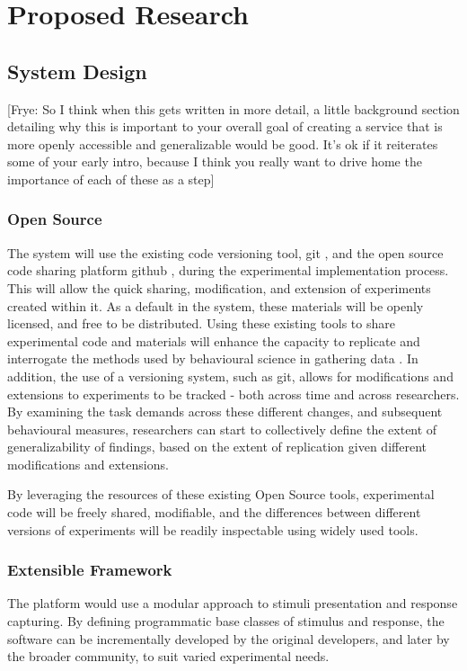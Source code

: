 \documentclass[12pt,a4paper,titlepage]{scrreprt}
\begin{document}
\chapter{Proposed Research}
\section{System Design}
[Frye: So I think when this gets written in more detail, a little background section detailing why this is important to your overall goal of creating a service that is more openly accessible and generalizable would be good. It's ok if it reiterates some of your early intro, because I think you really want to drive home the importance of each of these as a step]
\subsection{Open Source}

The system will use the existing code versioning tool, git \parencite{_git_????}, and the open source code sharing platform github \parencite{_github_????}, during the experimental implementation process. This will allow the quick sharing, modification, and extension of experiments created within it. As a default in the system, these materials will be openly licensed, and free to be distributed. Using these existing tools to share experimental code and materials will enhance the capacity to replicate and interrogate the methods used by behavioural science in gathering data \parencite{giner-sorolla_science_2012,nosek_scientific_2012,miguel_promoting_2014}. In addition, the use of a versioning system, such as git, allows for modifications and extensions to experiments to be tracked - both across time and across researchers. By examining the task demands across these different changes, and subsequent behavioural measures, researchers can start to collectively define the extent of generalizability of findings, based on the extent of replication given different modifications and extensions.

By leveraging the resources of these existing Open Source tools, experimental code will be freely shared, modifiable, and the differences between different versions of experiments will be readily inspectable using widely used tools.
\subsection{Extensible Framework}
The platform would use a modular approach to stimuli presentation and response capturing. By defining programmatic base classes of stimulus and response, the software can be incrementally developed by the original developers, and later by the broader community, to suit varied experimental needs. 
\end{document}
